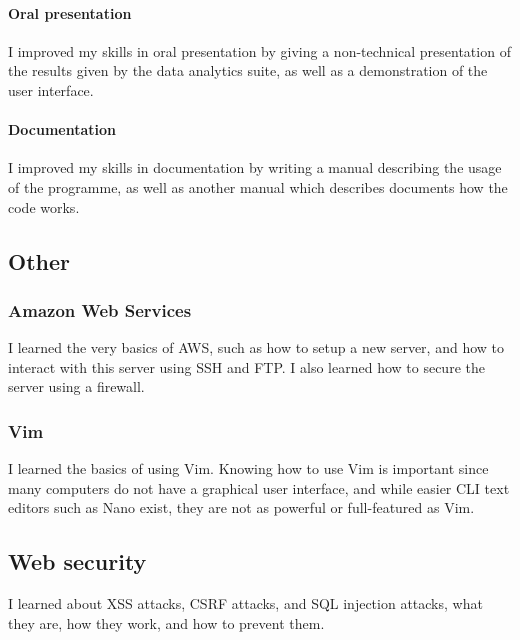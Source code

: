             \paragraph{Oral presentation}
            I improved my skills in oral presentation by giving a non-technical presentation of the results given by the data analytics suite, as well as a demonstration of the user interface.
            \paragraph{Documentation}
            I improved my skills in documentation by writing a manual describing the usage of the programme, as well as another manual which describes documents how the code works.
        \subsection{Other}
            \subsubsection{Amazon Web Services}
            I learned the very basics of AWS, such as how to setup a new server, and how to interact with this server using SSH and FTP. I also learned how to secure the server using a firewall.
            \subsubsection{Vim}
            I learned the basics of using Vim. Knowing how to use Vim is important since many computers do not have a graphical user interface, and while easier CLI text editors such as Nano exist, they are not as powerful or full-featured as Vim.
            \subsection{Web security}
            I learned about XSS attacks, CSRF attacks, and SQL injection attacks, what they are, how they work, and how to prevent them.

